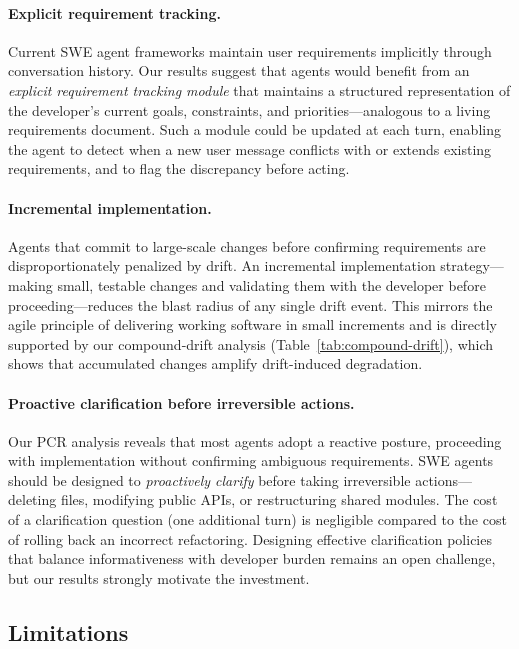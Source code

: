\paragraph{Explicit requirement tracking.}
Current SWE agent frameworks maintain user requirements implicitly through conversation history. Our results suggest that agents would benefit from an \emph{explicit requirement tracking module} that maintains a structured representation of the developer's current goals, constraints, and priorities---analogous to a living requirements document. Such a module could be updated at each turn, enabling the agent to detect when a new user message conflicts with or extends existing requirements, and to flag the discrepancy before acting.

\paragraph{Incremental implementation.}
Agents that commit to large-scale changes before confirming requirements are disproportionately penalized by drift. An incremental implementation strategy---making small, testable changes and validating them with the developer before proceeding---reduces the blast radius of any single drift event. This mirrors the agile principle of delivering working software in small increments and is directly supported by our compound-drift analysis (Table~\ref{tab:compound-drift}), which shows that accumulated changes amplify drift-induced degradation.

\paragraph{Proactive clarification before irreversible actions.}
Our PCR analysis reveals that most agents adopt a reactive posture, proceeding with implementation without confirming ambiguous requirements. SWE agents should be designed to \emph{proactively clarify} before taking irreversible actions---deleting files, modifying public APIs, or restructuring shared modules. The cost of a clarification question (one additional turn) is negligible compared to the cost of rolling back an incorrect refactoring. Designing effective clarification policies that balance informativeness with developer burden remains an open challenge, but our results strongly motivate the investment.

\subsection{Limitations}
\label{sec:disc-limitations}

